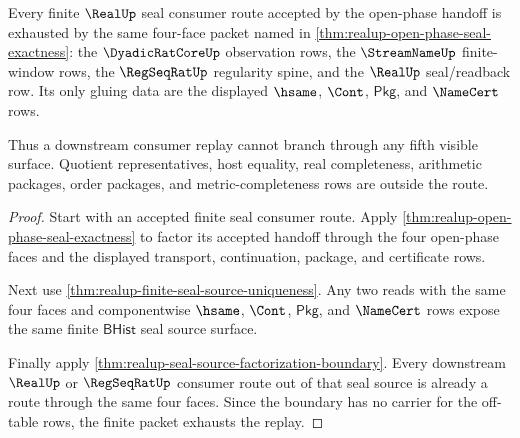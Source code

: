 \begin{theorem}
\label{thm:realup-open-phase-seal-route-totality}
Every finite $\RealUp$ seal consumer route accepted by the open-phase handoff
is exhausted by the same four-face packet named in
\autoref{thm:realup-open-phase-seal-exactness}: the $\DyadicRatCoreUp$
observation rows, the $\StreamNameUp$ finite-window rows, the $\RegSeqRatUp$
regularity spine, and the $\RealUp$ seal/readback row. Its only gluing data are
the displayed $\hsame$, $\Cont$, $\mathsf{Pkg}$, and $\NameCert$ rows.

Thus a downstream consumer replay cannot branch through any fifth visible
surface. Quotient representatives, host equality, real completeness, arithmetic
packages, order packages, and metric-completeness rows are outside the route.
\end{theorem}
\begin{proof}
Start with an accepted finite seal consumer route. Apply
\autoref{thm:realup-open-phase-seal-exactness} to factor its accepted handoff
through the four open-phase faces and the displayed transport, continuation,
package, and certificate rows.

Next use \autoref{thm:realup-finite-seal-source-uniqueness}. Any two reads with
the same four faces and componentwise $\hsame$, $\Cont$, $\mathsf{Pkg}$, and
$\NameCert$ rows expose the same finite $\mathsf{BHist}$ seal source surface.

Finally apply
\autoref{thm:realup-seal-source-factorization-boundary}. Every downstream
$\RealUp$ or $\RegSeqRatUp$ consumer route out of that seal source is already a
route through the same four faces. Since the boundary has no carrier for the
off-table rows, the finite packet exhausts the replay.
\end{proof}

